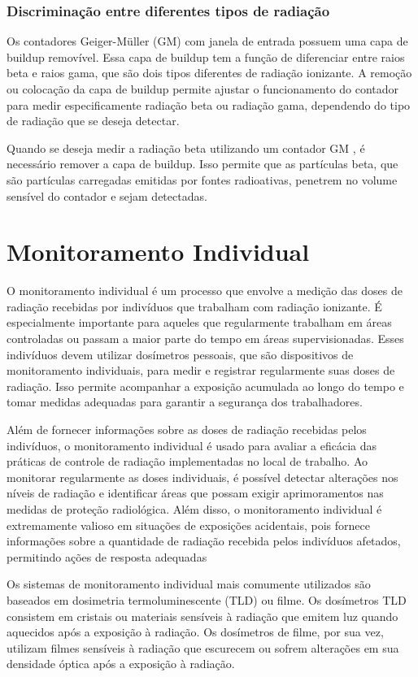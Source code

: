 \documentclass[11pt,a4paper]{article}
\begin{document}
\subsubsection*{Discriminação entre diferentes tipos de radiação}

	Os contadores Geiger-Müller (GM) com janela de entrada possuem uma capa de buildup removível. Essa capa de buildup tem a função de diferenciar entre raios beta e raios gama, que são dois tipos diferentes de radiação ionizante. A remoção ou colocação da capa de buildup permite ajustar o funcionamento do contador para medir especificamente radiação beta ou radiação gama, dependendo do tipo de radiação que se deseja detectar.

	Quando se deseja medir a radiação beta utilizando um contador GM , é necessário remover a capa de buildup. Isso permite que as partículas beta, que são partículas carregadas emitidas por fontes radioativas, penetrem no volume sensível do contador e sejam detectadas.

\section{Monitoramento Individual}

	O monitoramento individual é um processo que envolve a medição das doses de radiação recebidas por indivíduos que trabalham com radiação ionizante. É especialmente importante para aqueles que regularmente trabalham em áreas controladas ou passam a maior parte do tempo em áreas supervisionadas. Esses indivíduos devem utilizar dosímetros pessoais, que são dispositivos de monitoramento individuais, para medir e registrar regularmente suas doses de radiação. Isso permite acompanhar a exposição acumulada ao longo do tempo e tomar medidas adequadas para garantir a segurança dos trabalhadores.

	Além de fornecer informações sobre as doses de radiação recebidas pelos indivíduos, o monitoramento individual é usado para avaliar a eficácia das práticas de controle de radiação implementadas no local de trabalho. Ao monitorar regularmente as doses individuais, é possível detectar alterações nos níveis de radiação e identificar áreas que possam exigir aprimoramentos nas medidas de proteção radiológica. Além disso, o monitoramento individual é extremamente valioso em situações de exposições acidentais, pois fornece informações sobre a quantidade de radiação recebida pelos indivíduos afetados, permitindo ações de resposta adequadas

	Os sistemas de monitoramento individual mais comumente utilizados são baseados em dosimetria termoluminescente (TLD) ou filme. Os dosímetros TLD consistem em cristais ou materiais sensíveis à radiação que emitem luz quando aquecidos após a exposição à radiação. Os dosímetros de filme, por sua vez, utilizam filmes sensíveis à radiação que escurecem ou sofrem alterações em sua densidade óptica após a exposição à radiação.
\end{document}

